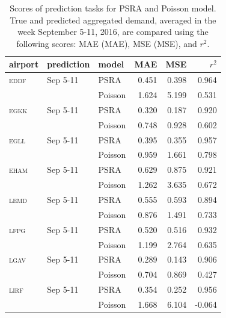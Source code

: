 \documentclass[]{elsarticle}
\newcommand{\airp}[1]{\textcolor{#1}{\textsc{#1}}}
\begin{document}
\begin{table}
  \centering
  \caption{Scores of prediction tasks for \acs{PSRA} and Poisson model. True and predicted aggregated demand, averaged in the week September 5-11, 2016, are compared using the following scores: \acl{MAE} (\acs{MAE}), \acl{MSE} (\acs{MSE}), and \(r^2\).}
  \label{tab:predictions_last_week}
  \begin{tabular}{lllrrr}
    \toprule
    airport    & prediction & model & \acs{MAE} & \acs{MSE} & \(r^2\)  \\
    \midrule
    \airp{eddf} & Sep 5-11  & \acs{PSRA} &  0.451 &   0.398 &  0.964 \\
         &                  & Poisson    &  1.624 &   5.199 &  0.531 \\
    \airp{egkk} & Sep 5-11  & \acs{PSRA} &  0.320 &   0.187 &  0.920 \\
         &                  & Poisson    &  0.748 &   0.928 &  0.602 \\
    \airp{egll} & Sep 5-11  & \acs{PSRA} &  0.395 &   0.355 &  0.957 \\
         &                  & Poisson    &  0.959 &   1.661 &  0.798 \\
    \airp{eham} & Sep 5-11  & \acs{PSRA} &  0.629 &   0.875 &  0.921 \\
         &                  & Poisson    &  1.262 &   3.635 &  0.672 \\
    \airp{lemd} & Sep 5-11  & \acs{PSRA} &  0.555 &   0.593 &  0.894 \\
         &                  & Poisson    &  0.876 &   1.491 &  0.733 \\
    \airp{lfpg} & Sep 5-11  & \acs{PSRA} &  0.520 &   0.516 &  0.932 \\
         &                  & Poisson    &  1.199 &   2.764 &  0.635 \\
    \airp{lgav} & Sep 5-11  & \acs{PSRA} &  0.289 &   0.143 &  0.906 \\
         &                  & Poisson    &  0.704 &   0.869 &  0.427 \\
    \airp{lirf} & Sep 5-11  & \acs{PSRA} &  0.354 &   0.252 &  0.956 \\
         &                  & Poisson    &  1.668 &   6.104 & -0.064 \\
    \bottomrule
  \end{tabular}
\end{table}
\end{document}
